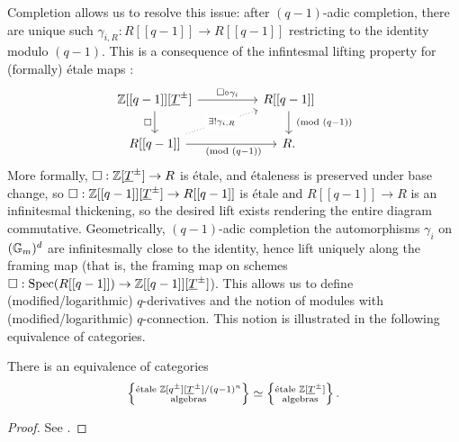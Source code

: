 Completion allows us to resolve this issue: after $(q-1)$-adic completion, there are unique such $\gamma_{i,R}:R[[q-1]]\to R[[q-1]]$ restricting to the identity modulo $(q-1)$. This is a consequence of the infintesmal lifting property for (formally) \'{e}tale maps \cite[\href{https://stacks.math.columbia.edu/tag/00UP}{Tag 00UP}]{stacks-project}: 
$$%
\begin{tikzcd}
	{\ZZ[[q-1]][\underline{T}^{\pm}]} && {R[[q-1]]} \\
	{R[[q-1]]} && R.
	\arrow["{\square\circ\gamma_{i}}", from=1-1, to=1-3]
	\arrow["\square"', from=1-1, to=2-1]
	\arrow["{\pmod{(q-1)}}", from=1-3, to=2-3]
	\arrow["{\exists!\gamma_{i,R}}"{description}, dotted, from=2-1, to=1-3]
	\arrow["{\pmod{(q-1)}}"', from=2-1, to=2-3]
\end{tikzcd}$$
More formally, $\square:\mathbb{Z}[\underline{T}^{\pm}]\to R$ is \'{e}tale, and \'{e}taleness is preserved under base change, so $\square:\mathbb{Z}[[q-1]][\underline{T}^{\pm}]\to R[[q-1]]$ is \'{e}tale and $R[[q-1]]\to R$ is an infinitesmal thickening, so the desired lift exists rendering the entire diagram commutative. Geometrically, $(q-1)$-adic completion the automorphisms $\gamma_{i}$ on $(\mathbb{G}_{m})^{d}$ are infinitesmally close to the identity, hence lift uniquely along the framing map (that is, the framing map on schemes $\square:\operatorname{Spec}(R[[q-1]])\to\mathbb{Z}[[q-1]][\underline{T}^{\pm}]$). This allows us to define (modified/logarithmic) $q$-derivatives and the notion of modules with (modified/logarithmic) $q$-connection. This notion is illustrated in the following equivalence of categories. 
\begin{lemma}\label{lem: equivalence of categories}
    There is an equivalence of categories 
    $$\left\{\substack{\text{\'{e}tale }\mathbb{Z}[q^{\pm}][\underline{T}^{\pm}]/(q-1)^{n} \\ \text{algebras}}\right\}\simeq\left\{\substack{\text{\'{e}tale }\mathbb{Z}[\underline{T}^{\pm}] \\ \text{algebras}}\right\}.$$
\end{lemma}
\begin{proof}
    See \cite[\href{https://stacks.math.columbia.edu/tag/039R}{Tag 039R}]{stacks-project}. 
\end{proof}
